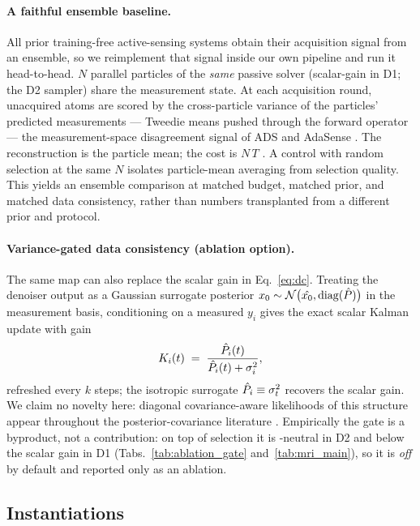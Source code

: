 \paragraph{A faithful ensemble baseline.}
All prior training-free active-sensing systems obtain their acquisition
signal from an ensemble, so we reimplement that signal inside our own
pipeline and run it head-to-head. $N$ parallel particles of the
\emph{same} passive solver (scalar-gain \pigdm{} in D1; the D2 sampler)
share the measurement state. At each acquisition round, unacquired atoms
are scored by the cross-particle variance of the particles' predicted
measurements --- Tweedie means pushed through the forward operator ---
the measurement-space disagreement signal of ADS and AdaSense
\cite{nolan2025ads,elata2024adasense}. The reconstruction is the
particle mean; the cost is $N\,T$ \nfe. A control with random selection
at the same $N$ isolates particle-mean averaging from selection quality.
This yields an ensemble comparison at matched budget, matched prior, and
matched data consistency, rather than numbers transplanted from a
different prior and protocol.

\paragraph{Variance-gated data consistency (ablation option).}
The same map can also replace the scalar gain in Eq.~\ref{eq:dc}.
Treating the denoiser output as a Gaussian surrogate posterior
$x_0 \sim \mathcal{N}\big(\hat{x_0}, \operatorname{diag}(\hat{P})\big)$ in the
measurement basis, conditioning on a measured $y_i$ gives the exact
scalar Kalman update with gain
\begin{equation}
  K_i(t) \;=\; \frac{\hat{P}_i(t)}{\hat{P}_i(t) + \sigma_i^2},
  \label{eq:gate}
\end{equation}
refreshed every $k$ steps; the isotropic surrogate $\hat{P}_i \equiv \sigma_t^2$
recovers the scalar \pigdm{} gain. We claim no novelty here: diagonal
covariance-aware likelihoods of this structure appear throughout the
posterior-covariance literature
\cite{peng2024covariance,boys2024tmpd,hamidi2024cadps,rissanen2025freehunch}.
Empirically the gate is a byproduct, not a contribution: on top of
selection it is \psnrm-neutral in D2 and below the scalar gain in D1
(Tabs.~\ref{tab:ablation_gate} and~\ref{tab:mri_main}), so it is
\emph{off} by default and reported only as an ablation.

\subsection{Instantiations}\label{sec:method_inst}

